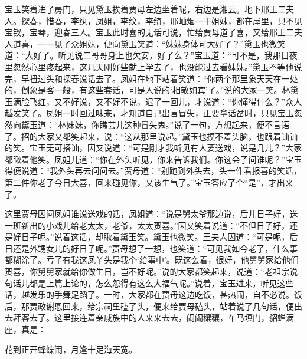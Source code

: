 \begin{parag}
    宝玉笑着进了房门，只见黛玉挨着贾母左边坐着呢，右边是湘云。地下邢王二夫人。探春，惜春，李纨，凤姐，李纹，李绮，邢岫烟一干姐妹，都在屋里，只不见宝钗，宝琴，迎春三人。宝玉此时喜的无话可说，忙给贾母道了喜，又给邢王二夫人道喜，一一见了众姐妹，便向黛玉笑道：“妹妹身体可大好了？”黛玉也微笑道：“大好了。听见说二哥哥身上也欠安，好了么？”宝玉道：“可不是，我那日夜里忽然心里疼起来，这几天刚好些就上学去了，也没能过去看妹妹。”黛玉不等他说完，早扭过头和探春说话去了。凤姐在地下站着笑道：“你两个那里象天天在一处的，倒象是客一般，有这些套话，可是人说的‘相敬如宾’了。”说的大家一笑。林黛玉满脸飞红，又不好说，又不好不说，迟了一回儿，才说道：“你懂得什么？”众人越发笑了。凤姐一时回过味来，才知道自己出言冒失，正要拿话岔时，只见宝玉忽然向黛玉道：“林妹妹，你瞧芸儿这种冒失鬼。”说了一句，方想起来，便不言语了。招的大家又都笑起来，说：“这从那里说起。”黛玉也摸不着头脑，也跟着讪讪的笑。宝玉无可搭讪，因又说道：“可是刚才我听见有人要送戏，说是几儿？”大家都瞅着他笑。凤姐儿道：“你在外头听见，你来告诉我们。你这会子问谁呢？”宝玉得便说道：“我外头再去问问去。”贾母道：“别跑到外头去，头一件看报喜的笑话，第二件你老子今日大喜，回来碰见你，又该生气了。”宝玉答应了个“是”，才出来了。
\end{parag}


\begin{parag}
    这里贾母因问凤姐谁说送戏的话，凤姐道：“说是舅太爷那边说，后儿日子好，送一班新出的小戏儿给老太太，老爷，太太贺喜。”因又笑着说道：“不但日子好，还是好日子呢。”说着这话，却瞅着黛玉笑。黛玉也微笑。王夫人因道：“可是呢，后日还是外甥女儿的好日子呢。”贾母想了一想，也笑道：“可见我如今老了，什么事都糊涂了。亏了有我这凤丫头是我个‘给事中’。既这么着，很好，他舅舅家给他们贺喜，你舅舅家就给你做生日，岂不好呢。”说的大家都笑起来，说道：“老祖宗说句话儿都是上篇上论的，怎么怨得有这么大福气呢。”说着，宝玉进来，听见这些话，越发乐的手舞足蹈了。一时，大家都在贾母这边吃饭，甚热闹，自不必说。饭后，那贾政谢恩回来，给宗祠里磕了头，便来给贾母磕头，站着说了几句话，便出去拜客去了。这里接连着亲戚族中的人来来去去，闹闹穰穰，车马填门，貂蝉满座，真是：
\end{parag}


\begin{poem}
    \begin{pl}
        花到正开蜂蝶闹，月逢十足海天宽。
    \end{pl}
\end{poem}



